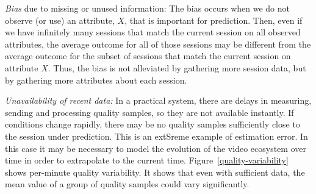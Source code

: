 \begin{packedenumerate}
\item \emph{Bias} due to missing or unused information: The bias occurs when we do not observe (or use) an attribute, $X$, that is important for prediction. Then, even if we have infinitely many sessions that match the current session on all observed attributes, the average outcome for all of those sessions may be different from the average outcome for the subset of sessions that match the current session on attribute $X$.  Thus, the bias is not alleviated by gathering more session data, but by gathering more attributes about each session.
\item \emph{Unavailability of recent data:} In a practical system, there are delays in measuring, sending and processing quality samples, so they are not available instantly.  If conditions change rapidly, there may be no quality samples sufficiently close to the session under prediction.  This is an extSreme example of estimation error.  In this case it may be necessary to model the evolution of the video ecosystem over time in order to extrapolate to the current time. Figure~\ref{quality-variability} shows per-minute quality variability. It shows that even with sufficient data, the mean value of a group of quality samples could vary significantly.


\end{packedenumerate}

